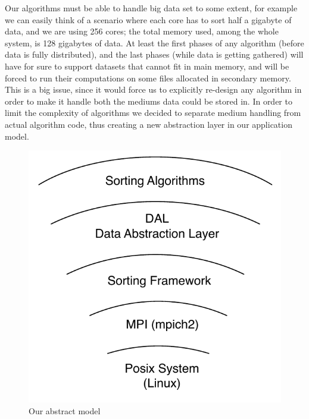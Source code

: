 Our algorithms must be able to handle big data set to some extent, for example we can easily think of a scenario where each core has to sort half a gigabyte of data, and we are using 256 cores; the total memory used, among the whole system, is 128 gigabytes of data.
At least the first phases of any algorithm (before data is fully distributed), and the last phases (while data is getting gathered) will have for sure to support datasets that cannot fit in main memory, and will be forced to run their computations on some files allocated in secondary memory.
This is a big issue, since it would force us to explicitly re-design any algorithm in order to make it handle both the mediums data could be stored in.
In order to limit the complexity of algorithms we decided to separate medium handling from actual algorithm code, thus creating a new abstraction layer in our application model.

\begin{figure}
  \begin{center}
    \includegraphics[scale=0.50]{levels}
  \end{center}
  \caption{Our abstract model}
  \label{levels}
\end{figure}

